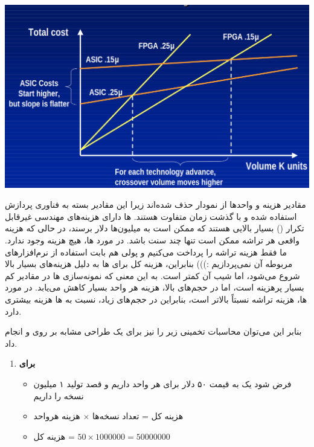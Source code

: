 \begin{qsolve}
	\begin{center}
		\includegraphics*[width=0.8\linewidth]{pics/img5.png}
		\label{نمودار هزینه‌های اف‌پی‌جی‌ای و ایسیک}
	\end{center}
	
	
	مقادیر هزینه و واحدها از نمودار حذف شده‌اند زیرا این مقادیر بسته به فناوری پردازش استفاده شده و با گذشت زمان متفاوت هستند. ها دارای هزینه‌های مهندسی غیرقابل تکرار () بسیار بالایی هستند که ممکن است به میلیون‌ها دلار برسند، در حالی که هزینه واقعی هر تراشه ممکن است تنها چند سنت باشد. در مورد ها، هیچ هزینه  وجود ندارد. ما فقط هزینه تراشه  را پرداخت می‌کنیم و پولی هم بابت استفاده از نرم‌افزار‌های مربوطه آن نمی‌پردازیم :))) بنابراین، هزینه کل برای ها به دلیل هزینه‌های  بسیار بالا شروع می‌شود، اما شیب آن کمتر است. به این معنی که نمونه‌سازی ها در مقادیر کم بسیار پرهزینه است، اما در حجم‌های بالا، هزینه هر واحد بسیار کاهش می‌یابد. در مورد ‌ها، هزینه تراشه نسبتاً بالاتر است، بنابراین در حجم‌های زیاد، نسبت به ‌ها هزینه بیشتری دارد.
	
	بنابر این می‌توان محاسبات تخمینی زیر را نیز برای یک طراحی مشابه بر روی 	و  انجام داد.
	
	\begin{enumerate}
		\item 
		\textbf{برای }
		\begin{itemize}
			\item 
			فرض شود یک  به قیمت ۵۰ دلار برای هر واحد داریم و قصد تولید ۱ میلیون نسخه را داریم
			
			\item 
			هزینه کل = تعداد نسخه‌ها $\times$ هزینه هرواحد
			
			\item 
			هزینه کل = $50 \times 1000000 = 50000000 $
		

\end{itemize}
\end{enumerate}
\end{qsolve}
